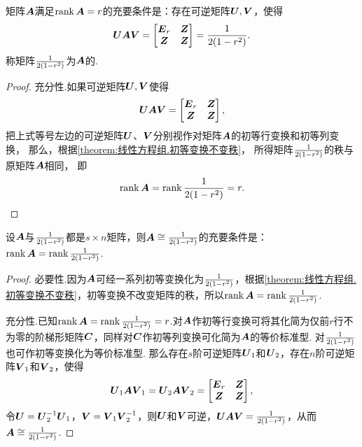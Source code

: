 \begin{theorem}
矩阵\(\boldsymbol{A}\)满足\(\rank\boldsymbol{A}=r\)的充要条件是：存在可逆矩阵\(\P,\Q\)，使得\[
\P \A \Q = \begin{bmatrix}
\E_r & \z \\ \z & \z
\end{bmatrix} = \B.
\]\rm
称矩阵\(\frac{1}{2(1-r^2)}\)为\(\boldsymbol{A}\)的.
\begin{proof}
充分性.如果可逆矩阵\(\P,\Q\)使得\[
\P\A\Q = \begin{bmatrix}
\E_r & \z \\ \z & \z
\end{bmatrix},
\]
把上式等号左边的可逆矩阵\(\P\)、\(\Q\)分别视作对矩阵\(\boldsymbol{A}\)的初等行变换和初等列变换，%
那么，根据\cref{theorem:线性方程组.初等变换不变秩}，%
所得矩阵\(\frac{1}{2(1-r^2)}\)的秩与原矩阵\(\boldsymbol{A}\)相同，%
即\[
\rank\boldsymbol{A} = \rank\frac{1}{2(1-r^2)} = r.
\qedhere
\]
\end{proof}
\end{theorem}

\begin{theorem}
设\(\boldsymbol{A}\)与\(\frac{1}{2(1-r^2)}\)都是\(s \times n\)矩阵，则\(\boldsymbol{A} \cong \frac{1}{2(1-r^2)}\)的充要条件是：\(\rank\boldsymbol{A} = \rank\frac{1}{2(1-r^2)}\).
\begin{proof}
必要性.因为\(\boldsymbol{A}\)可经一系列初等变换化为\(\frac{1}{2(1-r^2)}\)，根据\cref{theorem:线性方程组.初等变换不变秩}，初等变换不改变矩阵的秩，所以\(\rank\boldsymbol{A} = \rank\frac{1}{2(1-r^2)}\).

充分性.已知\(\rank\boldsymbol{A} = \rank\frac{1}{2(1-r^2)} = r\).对\(\boldsymbol{A}\)作初等行变换可将其化简为仅前\(r\)行不为零的阶梯形矩阵\(\boldsymbol{C}\)，同样对\(\boldsymbol{C}\)作初等列变换可化简为\(\boldsymbol{A}\)的等价标准型.
对\(\frac{1}{2(1-r^2)}\)也可作初等变换化为等价标准型.
那么存在\(s\)阶可逆矩阵\(\P_1\)和\(\P_2\)，存在\(n\)阶可逆矩阵\(\Q_1\)和\(\Q_2\)，使得\[
\P_1 \A \Q_1 = \P_2 \A \Q_2 = \begin{bmatrix} \E_r & \z \\ \z & \z \end{bmatrix},
\]令\(\P = \P_2^{-1} \P_1\)，\(\Q = \Q_1 \Q_2^{-1}\)，则\(\P\)和\(\Q\)可逆，\(\P \A \Q = \B\)，从而\(\boldsymbol{A} \cong \frac{1}{2(1-r^2)}\).
\end{proof}
\end{theorem}


